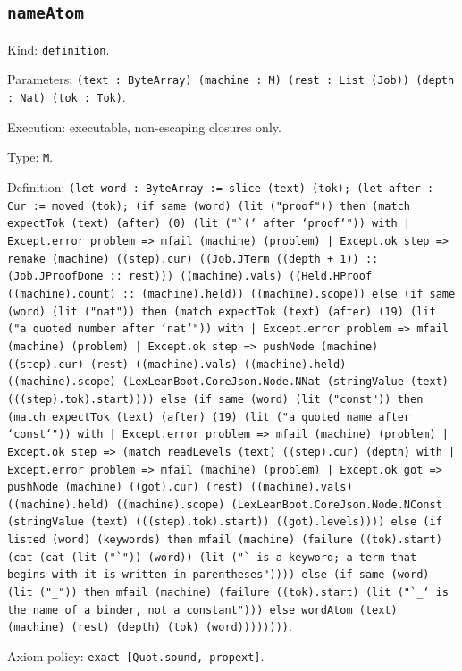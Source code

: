 \documentclass[11pt]{article}
\begin{document}
\subsection*{\texttt{nameAtom}}
\noindent Kind: \texttt{definition}.\par
\noindent Parameters: \texttt{(text : ByteArray) (machine : M) (rest : List (Job)) (depth : Nat) (tok : Tok)}.\par
\noindent Execution: executable, non-escaping closures only.\par
\noindent Type: \texttt{M}.\par
\noindent Definition: \texttt{(let word : ByteArray := slice (text) (tok); (let after : Cur := moved (tok); (if same (word) (lit ("proof")) then (match expectTok (text) (after) (0) (lit ("`(` after `proof`")) with | Except.error problem => mfail (machine) (problem) | Except.ok step => remake (machine) ((step).cur) ((Job.JTerm ((depth + 1)) :: (Job.JProofDone :: rest))) ((machine).vals) ((Held.HProof ((machine).count) :: (machine).held)) ((machine).scope)) else (if same (word) (lit ("nat")) then (match expectTok (text) (after) (19) (lit ("a quoted number after `nat`")) with | Except.error problem => mfail (machine) (problem) | Except.ok step => pushNode (machine) ((step).cur) (rest) ((machine).vals) ((machine).held) ((machine).scope) (LexLeanBoot.CoreJson.Node.NNat (stringValue (text) (((step).tok).start)))) else (if same (word) (lit ("const")) then (match expectTok (text) (after) (19) (lit ("a quoted name after `const`")) with | Except.error problem => mfail (machine) (problem) | Except.ok step => (match readLevels (text) ((step).cur) (depth) with | Except.error problem => mfail (machine) (problem) | Except.ok got => pushNode (machine) ((got).cur) (rest) ((machine).vals) ((machine).held) ((machine).scope) (LexLeanBoot.CoreJson.Node.NConst (stringValue (text) (((step).tok).start)) ((got).levels)))) else (if listed (word) (keywords) then mfail (machine) (failure ((tok).start) (cat (cat (lit ("`")) (word)) (lit ("` is a keyword; a term that begins with it is written in parentheses")))) else (if same (word) (lit ("\_")) then mfail (machine) (failure ((tok).start) (lit ("`\_` is the name of a binder, not a constant"))) else wordAtom (text) (machine) (rest) (depth) (tok) (word))))))))}.\par
\noindent Axiom policy: \texttt{exact [Quot.sound, propext]}.\par
\end{document}
